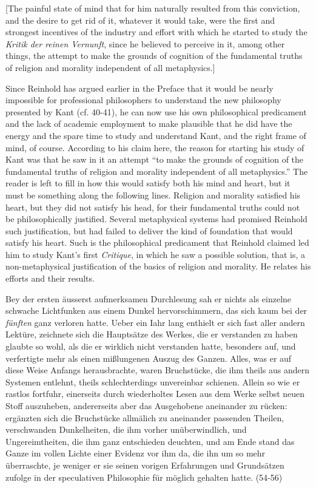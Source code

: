 [The painful state of mind that for him naturally resulted from this conviction, and the desire to get rid of it, whatever it would take, were the first and strongest incentives of the industry and effort with which he started to study the \textit{Kritik der reinen Vernunft}, since he believed to perceive in it, among other things, the attempt to make the grounds of cognition of the fundamental truths of religion and morality independent of all metaphysics.]

Since Reinhold has argued earlier in the Preface that it would be nearly impossible for professional philosophers to understand the new philosophy presented by Kant (cf. 40{-}41), he can now use his own philosophical predicament and the lack of academic employment to make plausible that he did have the energy and the spare time to study and understand Kant, and the right frame of mind, of course. According to his claim here, the reason for starting his study of Kant was that he saw in it an attempt ``to make the grounds of cognition of the fundamental truths of religion and morality independent of all metaphysics.'' The reader is left to fill in how this would satisfy both his mind and heart, but it must be something along the following lines. Religion and morality satisfied his heart, but they did not satisfy his head, for their fundamental truths could not be philosophically justified. Several metaphysical systems had promised Reinhold such justification, but had failed to deliver the kind of foundation that would satisfy his heart. Such is the philosophical predicament that Reinhold claimed led him to study Kant's first \textit{Critique}, in which he saw a possible solution, that is, a non{-}metaphysical justification of the basics of religion and morality. He relates his efforts and their results. 

Bey der ersten \"{a}usserst aufmerksamen Durchlesung sah er nichts als einzelne schwache Lichtfunken aus einem Dunkel hervorschimmern, das sich kaum bei der \textit{f\"{u}nften }ganz verloren hatte. Ueber ein Iahr lang enthielt er sich fast aller andern Lekt\"{u}re, zeichnete sich die Haupts\"{a}tze des Werkes, die er verstanden zu haben glaubte so wohl, als die er wirklich nicht verstanden hatte, besonders auf, und verfertigte mehr als einen mi\ss{}lungenen Auszug des Ganzen. Alles, was er auf diese Weise Anfangs herausbrachte, waren Bruchst\"{u}cke, die ihm theils aus andern Systemen entlehnt, theils schlechterdings unvereinbar schienen. Allein so wie er rastlos fortfuhr, einerseits durch wiederholtes Lesen aus dem Werke selbst neuen Stoff auszuheben, andererseits aber das Ausgehobene aneinander zu r\"{u}cken: erg\"{a}nzten sich die Bruchst\"{u}cke allm\"{a}lich zu aneinander passenden Theilen, verschwanden Dunkelheiten, die ihm vorher un\"{u}berwindlich, und Ungereimtheiten, die ihm ganz entschieden deuchten, und am Ende stand das Ganze im vollen Lichte einer Evidenz vor ihm da, die ihn um so mehr \"{u}berraschte, je weniger er sie seinen vorigen Erfahrungen und Grunds\"{a}tzen zufolge in der speculativen Philosophie f\"{u}r m\"{o}glich gehalten hatte. (54{-}56)

